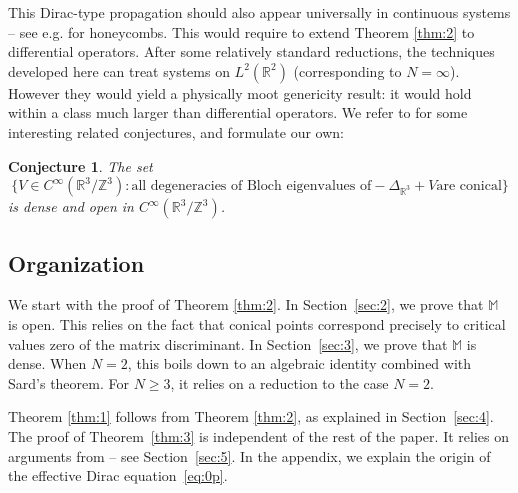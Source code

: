 \documentclass[10pt]{amsart}
\let\sep:
\newtheorem{conj}{Conjecture}
\theoremstyle{definition}
\newcommand{\R}{\mathbb{R}}
\newcommand{\Mm}{\mathbb{M}}
\newcommand{\Z}{\mathbb{Z}}
\providecommand{\eg}{e.g.}\providecommand{\ie}{i.e.}\providecommand{\etc}{etc.}\providecommand{\resp}{resp.}\providecommand{\cf}{cf.}
\begin{document}
This Dirac-type propagation should also appear universally in continuous systems -- see \eg \cite{RH08,FLW16,D19a,DW19} for honeycombs. This would require to extend Theorem \ref{thm:2} to differential operators. After some relatively standard reductions, the techniques developed here can treat systems on $L^2(\R^2)$ (corresponding to $N = \infty$). However they would yield a physically moot genericity result: it would hold within a class much larger than differential operators. We refer to \cite{C91,K16} for some interesting related conjectures, and formulate our own:

\begin{conj} The set
\begin{equation*}
\bigl\{ V \in C^\infty(\R^3/\Z^3) \sep \text{all degeneracies of Bloch eigenvalues of} -\Delta_{\R^3}+V \text{are conical}\bigr\}
\end{equation*}
is dense and open in $C^\infty(\R^3/\Z^3)$.
\end{conj}

\subsection{Organization} We start with the proof of Theorem \ref{thm:2}. In Section~\ref{sec:2}, we prove that $\Mm$ is open. This relies on the fact that conical points correspond precisely to critical values zero of the matrix discriminant.
In Section~\ref{sec:3}, we prove that $\Mm$ is dense. When $N=2$, this boils down to an algebraic identity combined with Sard's theorem. For $N \geq 3$, it relies on a reduction to the case $N=2$.

Theorem \ref{thm:1} follows from Theorem \ref{thm:2}, as explained in Section~\ref{sec:4}. The proof of Theorem~\ref{thm:3} is independent of the rest of the paper. It relies on arguments from \cite{D19b} -- see Section~\ref{sec:5}. In the appendix, we explain the origin of the effective Dirac equation~\eqref{eq:0p}.
\end{document}
